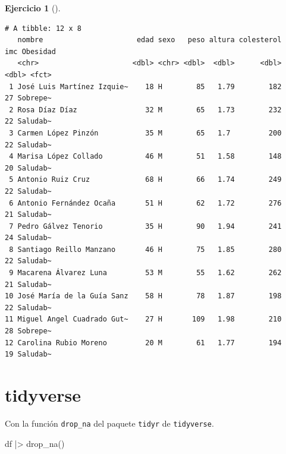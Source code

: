 \documentclass[
  spanish,
  a4paper,
]{scrreport}
\newenvironment{Shaded}{\begin{snugshade}}{\end{snugshade}}
\newcommand{\FunctionTok}[1]{\textcolor[rgb]{0.28,0.35,0.67}{#1}}
\newcommand{\NormalTok}[1]{\textcolor[rgb]{0.00,0.23,0.31}{#1}}
\newcommand{\SpecialCharTok}[1]{\textcolor[rgb]{0.37,0.37,0.37}{#1}}
\theoremstyle{definition}
\newtheorem{exercise}{Ejercicio}[chapter]
\theoremstyle{remark}
\begin{document}
\begin{exercise}[]
\begin{enumerate}
\begin{tcolorbox}
\begin{verbatim}
# A tibble: 12 x 8
   nombre                      edad sexo   peso altura colesterol   imc Obesidad
   <chr>                      <dbl> <chr> <dbl>  <dbl>      <dbl> <dbl> <fct>   
 1 José Luis Martínez Izquie~    18 H        85   1.79        182    27 Sobrepe~
 2 Rosa Díaz Díaz                32 M        65   1.73        232    22 Saludab~
 3 Carmen López Pinzón           35 M        65   1.7         200    22 Saludab~
 4 Marisa López Collado          46 M        51   1.58        148    20 Saludab~
 5 Antonio Ruiz Cruz             68 H        66   1.74        249    22 Saludab~
 6 Antonio Fernández Ocaña       51 H        62   1.72        276    21 Saludab~
 7 Pedro Gálvez Tenorio          35 H        90   1.94        241    24 Saludab~
 8 Santiago Reillo Manzano       46 H        75   1.85        280    22 Saludab~
 9 Macarena Álvarez Luna         53 M        55   1.62        262    21 Saludab~
10 José María de la Guía Sanz    58 H        78   1.87        198    22 Saludab~
11 Miguel Angel Cuadrado Gut~    27 H       109   1.98        210    28 Sobrepe~
12 Carolina Rubio Moreno         20 M        61   1.77        194    19 Saludab~
\end{verbatim}

  \section{tidyverse}

  Con la función \texttt{drop\_na} del paquete \texttt{tidyr} de
  \texttt{tidyverse}.

\begin{Shaded}
\begin{Highlighting}[]
\NormalTok{df }\SpecialCharTok{|\textgreater{}} \FunctionTok{drop\_na}\NormalTok{()}
\end{Highlighting}
\end{Shaded}


\end{tcolorbox}
\end{enumerate}
\end{exercise}
\end{document}
